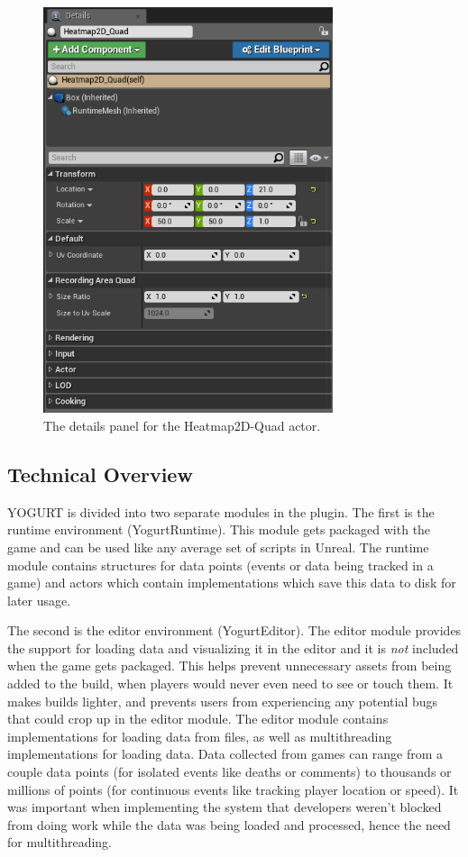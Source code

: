 \documentclass[journal]{IEEEtran}
\begin{document}
\begin{figure}[h]
\includegraphics[width=8.5cm]{"scene_quad_details"}
\caption{The details panel for the Heatmap2D-Quad actor.}
\label{sceneQuadDetails}
\end{figure}

\subsection{Technical Overview}

YOGURT is divided into two separate modules in the plugin. The first is the runtime environment (YogurtRuntime). This module gets packaged with the game and can be used like any average set of scripts in Unreal. The runtime module contains structures for data points (events or data being tracked in a game) and actors which contain implementations which save this data to disk for later usage.

The second is the editor environment (YogurtEditor). The editor module provides the support for loading data and visualizing it in the editor and it is \emph{not} included when the game gets packaged. This helps prevent unnecessary assets from being added to the build, when players would never even need to see or touch them. It makes builds lighter, and prevents users from experiencing any potential bugs that could crop up in the editor module. The editor module contains implementations for loading data from files, as well as multithreading implementations for loading data. Data collected from games can range from a couple data points (for isolated events like deaths or comments) to thousands or millions of points (for continuous events like tracking player location or speed). It was important when implementing the system that developers weren't blocked from doing work while the data was being loaded and processed, hence the need for multithreading.
\end{document}
